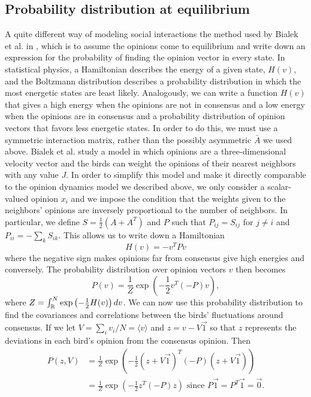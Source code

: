\documentclass{article}
\begin{document}
\subsection{Probability distribution at equilibrium }
A quite different way of modeling social interactions the method used by Bialek et al. in \cite{Bialek:2012fk}, which is to assume the opinions come to equilibrium and write down an expression for the probability of finding the opinion vector in every state. In statistical physics, a Hamiltonian describes the energy of a given state, $H(v)$, and the Boltzmann distribution describes a probability distribution in which the most energetic states are least likely. Analogously, we can write a function $H(v)$ that gives a high energy when the opinions are not in consensus and a low energy when the opinions are in consensus and a probability distribution of opinion vectors that favors less energetic states. In order to do this, we must use a symmetric interaction matrix, rather than the possibly asymmetric $\bar{A}$ we used above. Bialek et al. study a model in which opinions are a three-dimensional velocity vector and the birds can weight the opinions of their nearest neighbors with any value $J$. In order to simplify this model and make it directly comparable to the opinion dynamics model we described above, we only consider a scalar-valued opinion $x_i$ and we impose the condition that the weights given to the neighbors' opinions are inversely proportional to the number of neighbors. In particular, we define $S=\frac{1}{2}(A+A^T)$ and $P$ such that $P_{ij}=S_{ij}$ for $j\neq i$ and $P_{ii}=-\sum_kS_{ik}$. This allows us to write down a Hamiltonian
\begin{equation}
H(v)=-v^TPv
\end{equation}
where the negative sign makes opinions far from consensus give high energies and conversely. The probability distribution over opinion vectors $v$ then becomes 
\begin{equation}
P(v)=\frac{1}{Z}\exp\left(-\frac{1}{2}v^T(-P)v\right),
\end{equation}
where $Z=\int_{\mathbb{R}}^N\exp\left(-\frac{1}{2}H(v)\right)dv$. We can now use this probability distribution to find the  covariances and correlations between the birds' fluctuations around consensus.  If we let $V=\sum_iv_i/N=\langle v\rangle$ and $z=v-V\vec{1}$ so that $z$ represents the deviations in each bird's opinion from the consensus opinion. Then 
\begin{align*}
P(z,V)&=\frac{1}{Z}\exp\left(-\frac{1}{2}(z+V\vec{1})^T(-P)(z+V\vec{1})\right)
\\&=\frac{1}{Z}\exp\left(-\frac{1}{2}z^T(-P)z\right) \text{ since }P\vec{1}=P^T\vec{1}=\vec{0}.
\end{align*}
\end{document}
